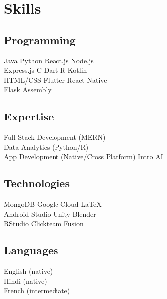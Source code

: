 \documentclass[]{saumya-resume}
\begin{document}
\begin{minipage}[t]{0.33\textwidth}

\section{Skills}
\subsection{Programming}
Java \textbullet{}   Python \textbullet{} React.js \textbullet{} Node.js \\
Express.js \textbullet{} C \textbullet{} Dart \textbullet{} R \textbullet{} Kotlin \textbullet{} \\ 
HTML/CSS \textbullet{} Flutter \textbullet{} React Native \\
Flask \textbullet{} Assembly
\sectionsep

\subsection{Expertise}
Full Stack Development (MERN) \textbullet{} \\
Data Analytics (Python/R) \textbullet{} \\
App Development (Native/Cross Platform) \textbullet{} Intro AI \\
\sectionsep

\subsection{Technologies}
MongoDB \textbullet{} Google Cloud \textbullet{} \LaTeX \\
Android Studio \textbullet{} Unity \textbullet{} Blender \\
RStudio \textbullet{} Clickteam Fusion \\
\sectionsep

\subsection{Languages}
English (native) \\
Hindi (native) \\
French (intermediate)
\sectionsep


\end{minipage} 
\hfill
\end{document}
